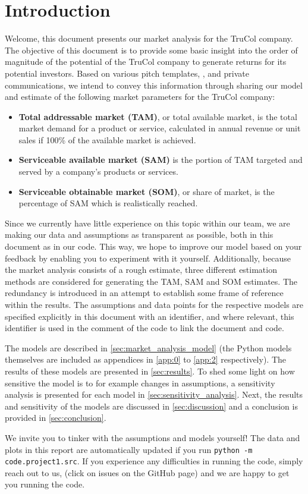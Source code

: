 \section{Introduction}\label{sec:intro}
Welcome, this document presents our market analysis for the TruCol company. The objective of this document is to provide some basic insight into the order of magnitude of the potential of the TruCol company to generate returns for its potential investors. Based on various pitch templates, \cite{kamps2020}, and private communications, we intend to convey this information through sharing our model and estimate of the following market parameters for the TruCol company:

\begin{itemize}
	\item \textbf{Total addressable market (TAM)}, or total available market, is the total market demand for a product or service, calculated in annual revenue or unit sales if 100\% of the available market is achieved\cite{tam_sam_som}.
	\item \textbf{Serviceable available market (SAM)} is the portion of TAM targeted and served by a company's products or services\cite{tam_sam_som}.
	\item \textbf{Serviceable obtainable market (SOM)}, or share of market, is the percentage of SAM which is realistically reached\cite{tam_sam_som}.
\end{itemize}


\noindent Since we currently have little experience on this topic within our team, we are making our data and assumptions as transparent as possible, both in this document as in our code. This way, we hope to improve our model based on your feedback by enabling you to experiment with it yourself. Additionally, because the market analysis consists of a rough estimate, three different estimation methods are considered for generating the TAM, SAM and SOM estimates. The redundancy is introduced in an attempt to establish some frame of reference within the results. %
The assumptions and data points for the respective models are specified explicitly in this document with an identifier, and where relevant, this identifier is used in the comment of the code to link the document and code.

The models are described in \cref{sec:market_analysis_model} (the Python models themselves are included as appendices in \cref{app:0} to \cref{app:2} respectively). The results of these models are presented in \cref{sec:results}. To shed some light on how sensitive the model is to for example changes in assumptions, a sensitivity analysis is presented for each model in \cref{sec:sensitivity_analysis}. Next, the results and sensitivity of the models are discussed in \cref{sec:discussion} and a conclusion is provided in \cref{sec:conclusion}.

We invite you to tinker with the assumptions and models yourself! The data and plots in this report are automatically updated if you run \verb+python -m code.project1.src+. If you experience any difficulties in running the code, simply reach out to us, (click on issues on the GitHub page) and we are happy to get you running the code.
